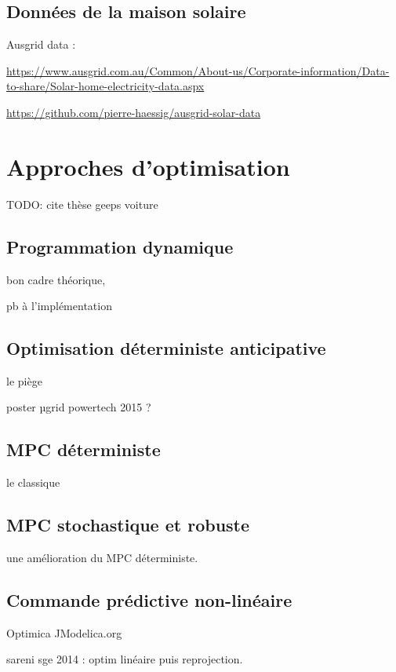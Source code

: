\documentclass[a4paper,10pt,twocolumn]{article}
\begin{document}
\subsection{Données de la maison solaire}

Ausgrid data :

\url{https://www.ausgrid.com.au/Common/About-us/Corporate-information/Data-to-share/Solar-home-electricity-data.aspx}

\url{https://github.com/pierre-haessig/ausgrid-solar-data}


\section{Approches d'optimisation}
\label{s:opt_meth}

TODO: cite thèse geeps voiture

\subsection{Programmation dynamique}
bon cadre théorique,

pb à l'implémentation

\cite{Haessig:2013:ESPy}

\subsection{Optimisation déterministe anticipative}
le piège

\cite{Rigo-Mariani:2014:SGE}

poster µgrid powertech 2015 ?

\subsection{MPC déterministe}
le classique

\subsection{MPC stochastique et robuste}

une amélioration du MPC déterministe.

\subsection{Commande prédictive non-linéaire}

Optimica JModelica.org \cite{Akesson:2010:CCE}

sareni sge 2014 \cite{Rigo-Mariani:2014:SGE} : optim linéaire puis reprojection.
\end{document}
